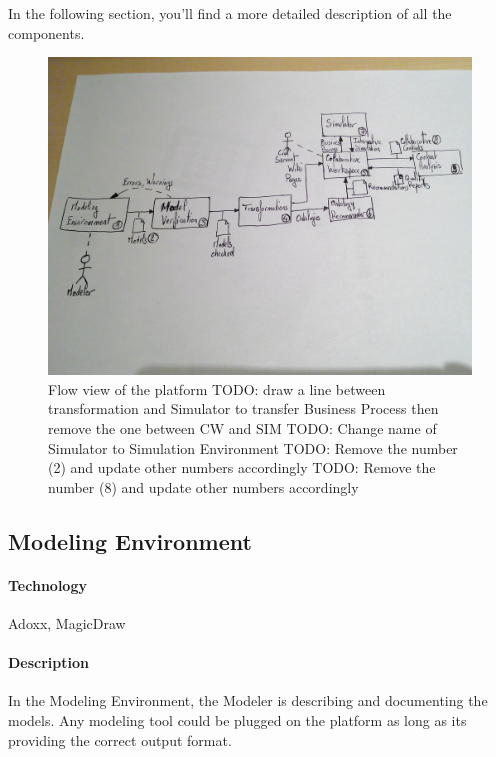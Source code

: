 \documentclass{learnpad}
\begin{document}
In the following section, you'll find a more detailed description of all the
components.

\begin{figure}[!htp]
	\centering
	\includegraphics[width=.6\paperwidth,keepaspectratio]{figures/learnpad-flow.jpg}
	\caption{Flow view of the \learnpad platform\newline
	TODO: draw a line between transformation and Simulator to transfer Business Process then remove the one between CW and SIM\newline
	TODO: Change name of Simulator to Simulation Environment\newline
	TODO: Remove the number (2) and update other numbers accordingly\newline
	TODO: Remove the number (8) and update other numbers accordingly}
	\label{fig:flow-view}
\end{figure}

\subsection{Modeling Environment}
\label{sec:modeling-environment}

\paragraph{Technology}
Adoxx, MagicDraw

\paragraph{Description}
In the Modeling Environment, the
Modeler is describing and documenting the models.  Any modeling tool could be
plugged on the \learnpad platform as long as its providing the correct output
format.
\end{document}
